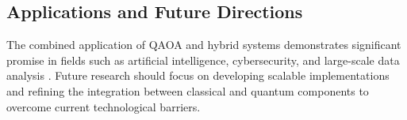 \documentclass{article}
\theoremstyle{plain}
\begin{document}
\subsection{Applications and Future Directions}
The combined application of QAOA and hybrid systems demonstrates significant promise in fields such as artificial intelligence, cybersecurity, and large-scale data analysis \cite{arute2019quantum}. Future research should focus on developing scalable implementations and refining the integration between classical and quantum components to overcome current technological barriers.



\end{document}
